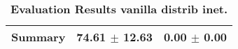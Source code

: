 \begin{table}[htb]
{\begin{tabular}{lll}
\midrule
\textbf{Summary                                  } &                  \phantom{0}74.61 $\pm$ 12.63 &              \phantom{0}0.00 $\pm$ \phantom{0}0.00 \\
\bottomrule
\end{tabular}%
}
\caption{\textbf{Evaluation Results vanilla distrib inet.}}
\label{tab:eval-results}
\end{table}
